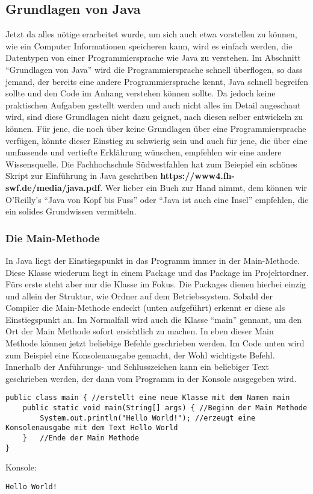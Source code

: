 \subsection{Grundlagen von Java}
Jetzt da alles nötige erarbeitet wurde, um sich auch etwa vorstellen zu können, wie ein Computer Informationen speicheren kann, wird es einfach werden, die Datentypen von einer Programmiersprache wie Java zu verstehen. Im Abschnitt "`Grundlagen von Java"' wird die Programmiersprache schnell überflogen, so dass jemand, der bereits eine andere Programmiersprache kennt, Java schnell begreifen sollte und den Code im Anhang verstehen können sollte. Da jedoch keine praktischen Aufgaben gestellt werden und auch nicht alles im Detail angeschaut wird, sind diese Grundlagen nicht dazu geignet, nach diesen selber entwickeln zu können. Für jene, die noch über keine Grundlagen über eine Programmiersprache verfügen, könnte dieser Einstieg zu schwierig sein und auch für jene, die über eine umfassende und vertiefte Erklährung wünschen, empfehlen wir eine andere Wissensquelle. Die Fachhochschule Südwestfahlen hat zum Beiepiel ein schönes Skript zur Einführung in Java geschriben \textbf{https://www4.fh-swf.de/media/java.pdf}. Wer lieber ein Buch zur Hand nimmt, dem können wir O'Reilly's "`Java von Kopf bis Fuss"' oder 	"`Java ist auch eine Insel"' empfehlen, die ein solides Grundwissen vermitteln.
\subsubsection{Die Main-Methode}
In Java liegt der Einstiegspunkt in das Programm immer in der Main-Methode. Diese Klasse wiederum liegt in einem Package und das Package im Projektordner. Fürs erste steht aber nur die Klasse im Fokus. Die Packages dienen hierbei einzig und allein der Struktur, wie Ordner auf dem Betriebssystem. Sobald der Compiler die Main-Methode endeckt (unten aufgeführt) erkennt er diese als Einstiegspunkt an. Im Normalfall wird auch die Klasse "`main"' gennant, um den Ort der Main Methode sofort ersichtlich zu machen. In eben dieser Main Methode können jetzt beliebige Befehle geschrieben werden. Im Code unten wird zum Beispiel eine Konsolenausgabe gemacht, der Wohl wichtigste Befehl. Innerhalb der Anführungs- und Schlusszeichen kann ein beliebiger Text geschrieben werden, der dann vom Programm in der Konsole ausgegeben wird.
\begin{lstlisting}
public class main { //erstellt eine neue Klasse mit dem Namen main
	public static void main(String[] args) { //Beginn der Main Methode
		System.out.println("Hello World!"); //erzeugt eine Konsolenausgabe mit dem Text Hello World
	}	//Ende der Main Methode
}
\end{lstlisting}
Konsole:
\begin{lstlisting}[style=console]
Hello World!
\end{lstlisting}
